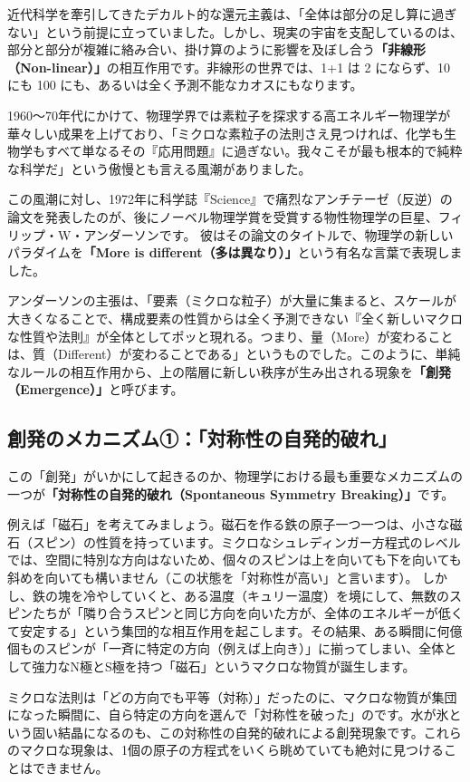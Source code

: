 近代科学を牽引してきたデカルト的な還元主義は、「全体は部分の足し算に過ぎない」という前提に立っていました。しかし、現実の宇宙を支配しているのは、部分と部分が複雑に絡み合い、掛け算のように影響を及ぼし合う\textbf{「非線形（Non-linear）」}の相互作用です。非線形の世界では、1+1 は 2 にならず、10 にも 100 にも、あるいは全く予測不能なカオスにもなります。

1960〜70年代にかけて、物理学界では素粒子を探求する高エネルギー物理学が華々しい成果を上げており、「ミクロな素粒子の法則さえ見つければ、化学も生物学もすべて単なるその『応用問題』に過ぎない。我々こそが最も根本的で純粋な科学だ」という傲慢とも言える風潮がありました。

この風潮に対し、1972年に科学誌『Science』で痛烈なアンチテーゼ（反逆）の論文を発表したのが、後にノーベル物理学賞を受賞する物性物理学の巨星、フィリップ・W・アンダーソンです。 彼はその論文のタイトルで、物理学の新しいパラダイムを\textbf{「More is different（多は異なり）」}という有名な言葉で表現しました。

アンダーソンの主張は、「要素（ミクロな粒子）が大量に集まると、スケールが大きくなることで、構成要素の性質からは全く予測できない『全く新しいマクロな性質や法則』が全体としてポッと現れる。つまり、量（More）が変わることは、質（Different）が変わることである」というものでした。このように、単純なルールの相互作用から、上の階層に新しい秩序が生み出される現象を\textbf{「創発（Emergence）」}と呼びます。

\subsection{創発のメカニズム①：「対称性の自発的破れ」}

この「創発」がいかにして起きるのか、物理学における最も重要なメカニズムの一つが\textbf{「対称性の自発的破れ（Spontaneous Symmetry Breaking）」}です。

例えば「磁石」を考えてみましょう。磁石を作る鉄の原子一つ一つは、小さな磁石（スピン）の性質を持っています。ミクロなシュレディンガー方程式のレベルでは、空間に特別な方向はないため、個々のスピンは上を向いても下を向いても斜めを向いても構いません（この状態を「対称性が高い」と言います）。 しかし、鉄の塊を冷やしていくと、ある温度（キュリー温度）を境にして、無数のスピンたちが「隣り合うスピンと同じ方向を向いた方が、全体のエネルギーが低くて安定する」という集団的な相互作用を起こします。その結果、ある瞬間に何億個ものスピンが「一斉に特定の方向（例えば上向き）」に揃ってしまい、全体として強力なN極とS極を持つ「磁石」というマクロな物質が誕生します。

ミクロな法則は「どの方向でも平等（対称）」だったのに、マクロな物質が集団になった瞬間に、自ら特定の方向を選んで「対称性を破った」のです。水が氷という固い結晶になるのも、この対称性の自発的破れによる創発現象です。これらのマクロな現象は、1個の原子の方程式をいくら眺めていても絶対に見つけることはできません。

